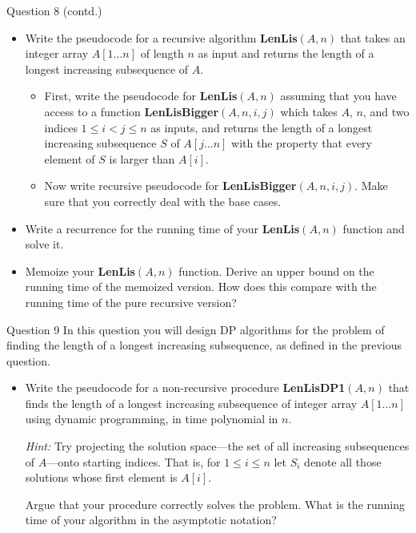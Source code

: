 \documentclass{beamer}
\begin{document}
\begin{frame}{Question 8 (contd.)}
\begin{itemize}
  \item[(a)] Write the pseudocode for a recursive algorithm \textbf{LenLis}$(A, n)$ that takes an integer array $A[1\ldots n]$ of length $n$ as input and returns the length of a longest increasing subsequence of $A$.
  \begin{itemize}
    \item[i.] First, write the pseudocode for \textbf{LenLis}$(A, n)$ assuming that you have access to a function \textbf{LenLisBigger}$(A, n, i, j)$ which takes $A$, $n$, and two indices $1 \leq i < j \leq n$ as inputs, and returns the length of a longest increasing subsequence $S$ of $A[j\ldots n]$ with the property that every element of $S$ is larger than $A[i]$.
    \item[ii.] Now write recursive pseudocode for \textbf{LenLisBigger}$(A, n, i, j)$. Make sure that you correctly deal with the base cases.
  \end{itemize}

  \item[(b)] Write a recurrence for the running time of your \textbf{LenLis}$(A, n)$ function and solve it.

  \item[(c)] Memoize your \textbf{LenLis}$(A, n)$ function. Derive an upper bound on the running time of the memoized version. How does this compare with the running time of the pure recursive version?
\end{itemize}
\end{frame}

\begin{frame}{}
\end{frame}
\begin{frame}{}
\end{frame}

\begin{frame}{Question 9}
In this question you will design DP algorithms for the problem of finding the length of a longest increasing subsequence, as defined in the previous question.

\medskip
\begin{itemize}
  \item[(a)] Write the pseudocode for a non-recursive procedure \textbf{LenLisDP1}$(A, n)$ that finds the length of a longest increasing subsequence of integer array $A[1\ldots n]$ using dynamic programming, in time polynomial in $n$.

  \textit{Hint:} Try projecting the solution space---the set of all increasing subsequences of $A$---onto starting indices. That is, for $1 \leq i \leq n$ let $S_i$ denote all those solutions whose first element is $A[i]$.

  Argue that your procedure correctly solves the problem. What is the running time of your algorithm in the asymptotic notation?
\end{itemize}
\end{frame}
\end{document}
